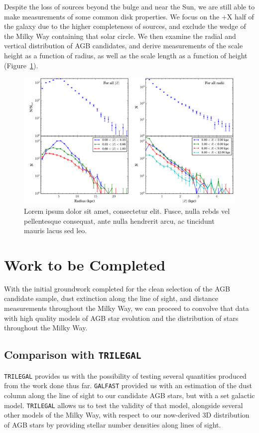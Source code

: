 Despite the loss of sources beyond the bulge and near the Sun, we are still able to make measurements of some common disk properties. We focus on the +X half of the galaxy due to the higher completeness of sources, and exclude the wedge of the Milky Way containing that solar circle. We then examine the radial and vertical distribution of AGB candidates, and derive measurements of the scale height as a function of radius, as well as the scale length as a function of height (Figure~\ref{fig:horvert_profile}).

\begin{figure}[h]
\centering
\includegraphics[width=6.5in]{figs/orich_radial_vertical_profile.pdf}
\caption{Lorem ipsum dolor sit amet, consectetur elit. Fusce, nulla rebds vel pellentesque consequat, ante nulla hendrerit arcu, ac tincidunt mauris lacus sed leo.}
\label{fig:horvert_profile}
\end{figure}

\section{Work to be Completed}
With the initial groundwork completed for the clean selection of the AGB candidate sample, dust extinction along the line of sight, and distance measurements throughout the Milky Way, we can proceed to convolve that data with high quality models of AGB star evolution and the distribution of stars throughout the Milky Way.
\subsection{Comparison with {\tt TRILEGAL}}
{\tt TRILEGAL} \citep{2005A&A...436..895G, 2007ASPC..378...20G} provides us with the possibility of testing several quantities produced from the work done thus far. {\tt GALFAST} provided us with an estimation of the dust column along the line of sight to our candidate AGB stars, but with a set galactic model. {\tt TRILEGAL}  allows us to test the validity of that model, alongside several other models of the Milky Way, with respect to our now-derived 3D distribution of AGB stars by providing stellar number densities along lines of sight.


